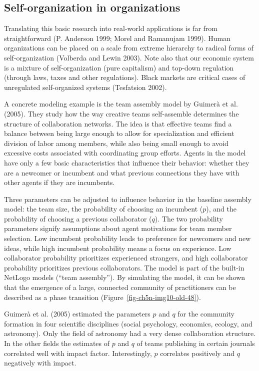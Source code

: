 \documentclass[
  a4paper,
  DIV=11,
  numbers=noendperiod,
  oneside]{scrreprt}
\begin{document}
\hypertarget{sec-Selforganization-in-organizations}{%
\subsection{Self-organization in
organizations}\label{sec-Selforganization-in-organizations}}

Translating this basic research into real-world applications is far from
straightforward (P. Anderson 1999; Morel and Ramanujam 1999). Human
organizations can be placed on a scale from extreme hierarchy to radical
forms of self-organization (Volberda and Lewin 2003). Note also that our
economic system is a mixture of self-organization (pure capitalism) and
top-down regulation (through laws, taxes and other regulations). Black
markets are critical cases of unregulated self-organized systems
(Tesfatsion 2002).

A concrete modeling example is the team assembly model by Guimerà et al.
(2005). They study how the way creative teams self-assemble determines
the structure of collaboration networks. The idea is that effective
teams find a balance between being large enough to allow for
specialization and efficient division of labor among members, while also
being small enough to avoid excessive costs associated with coordinating
group efforts. Agents in the model have only a few basic characteristics
that influence their behavior: whether they are a newcomer or incumbent
and what previous connections they have with other agents if they are
incumbents.

Three parameters can be adjusted to influence behavior in the baseline
assembly model: the team size, the probability of choosing an incumbent
(\(p\)), and the probability of choosing a previous collaborator
(\(q\)). The two probability parameters signify assumptions about agent
motivations for team member selection. Low incumbent probability leads
to preference for newcomers and new ideas, while high incumbent
probability means a focus on experience. Low collaborator probability
prioritizes experienced strangers, and high collaborator probability
prioritizes previous collaborators. The model is part of the built-in
NetLogo models (``team assembly''). By simulating the model, it can be
shown that the emergence of a large, connected community of
practitioners can be described as a phase transition
(Figure~\ref{fig-ch5n-img10-old-48}).

Guimerà et al. (2005) estimated the parameters \(p\) and \(q\) for the
community formation in four scientific disciplines (social psychology,
economics, ecology, and astronomy). Only the field of astronomy had a
very dense collaboration structure. In the other fields the estimates of
\(p\) and \(q\) of teams publishing in certain journals correlated well
with impact factor. Interestingly, \(p\) correlates positively and \(q\)
negatively with impact.
\end{document}
